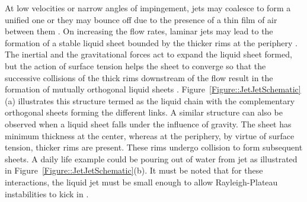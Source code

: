 At low velocities or narrow angles of impingement, jets may coalesce to form a unified one or they may bounce off due to the presence of a thin film of air between them \citep{wadhwa2013noncoalescence}. On increasing the flow rates, laminar jets may lead to the formation of a stable liquid sheet bounded by the thicker rims at the periphery \citep{yang2014liquid}. The inertial and the gravitational forces act to expand the liquid sheet formed, but the action of surface tension helps the sheet to converge so that the successive collisions of the thick rims downstream of the flow result in the formation of mutually orthogonal liquid sheets \citep{bush2004collision}. Figure~\ref{Figure::JetJetSchematic}(a) illustrates this structure termed as the liquid chain with the complementary orthogonal sheets forming the different links. A similar structure can also be observed when a liquid sheet falls under the influence of gravity. The sheet has minimum thickness at the center, whereas at the periphery, by virtue of surface tension, thicker rims are present. These rims undergo collision to form subsequent sheets. A daily life example could be pouring out of water from jet as illustrated in Figure~\ref{Figure::JetJetSchematic}(b). It  must be noted that for these interactions, the liquid jet must be small enough to allow Rayleigh-Plateau instabilities to kick in \citep{eggers2008physics}.
